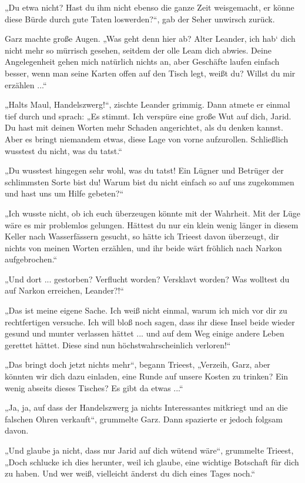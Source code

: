 „Du etwa nicht? Hast du ihm nicht ebenso die ganze Zeit weisgemacht, er könne diese Bürde durch gute Taten loswerden?“, gab der Seher unwirsch zurück.

Garz machte große Augen. „Was geht denn hier ab? Alter Leander, ich hab‘ dich nicht mehr so mürrisch gesehen, seitdem der olle Leam dich abwies. Deine Angelegenheit gehen mich natürlich nichts an, aber Geschäfte laufen einfach besser, wenn man seine Karten offen auf den Tisch legt, weißt du? Willst du mir erzählen ...“

„Halts Maul, Handelszwerg!“, zischte Leander grimmig. Dann atmete er einmal tief durch und sprach: „Es stimmt. Ich verspüre eine große Wut auf dich, Jarid. Du hast mit deinen Worten mehr Schaden angerichtet, als du denken kannst. Aber es bringt niemandem etwas, diese Lage von vorne aufzurollen. Schließlich wusstest du nicht, was du tatst.“

„Du wusstest hingegen sehr wohl, was du tatst! Ein Lügner und Betrüger der schlimmsten Sorte bist du! Warum bist du nicht einfach so auf uns zugekommen und hast uns um Hilfe gebeten?“

„Ich wusste nicht, ob ich euch überzeugen könnte mit der Wahrheit. Mit der Lüge wäre es mir problemlos gelungen. Hättest du nur ein klein wenig länger in diesem Keller nach Wasserfässern gesucht, so hätte ich Trieest davon überzeugt, dir nichts von meinen Worten erzählen, und ihr beide wärt fröhlich nach Narkon aufgebrochen.“

„Und dort ... gestorben? Verflucht worden? Versklavt worden? Was wolltest du auf Narkon erreichen, Leander?!“

„Das ist meine eigene Sache. Ich weiß nicht einmal, warum ich mich vor dir zu rechtfertigen versuche. Ich will bloß noch sagen, dass ihr diese Insel beide wieder gesund und munter verlassen hättet ... und auf dem Weg einige andere Leben gerettet hättet. Diese sind nun höchstwahrscheinlich verloren!“

„Das bringt doch jetzt nichts mehr“, begann Trieest, „Verzeih, Garz, aber könnten wir dich dazu einladen, eine Runde auf unsere Kosten zu trinken? Ein wenig abseits dieses Tisches? Es gibt da etwas ...“

„Ja, ja, auf dass der Handelszwerg ja nichts Interessantes mitkriegt und an die falschen Ohren verkauft“, grummelte Garz. Dann spazierte er jedoch folgsam davon.

„Und glaube ja nicht, dass nur Jarid auf dich wütend wäre“, grummelte Trieest, „Doch schlucke ich dies herunter, weil ich glaube, eine wichtige Botschaft für dich zu haben. Und wer weiß, vielleicht änderst du dich eines Tages noch.“

